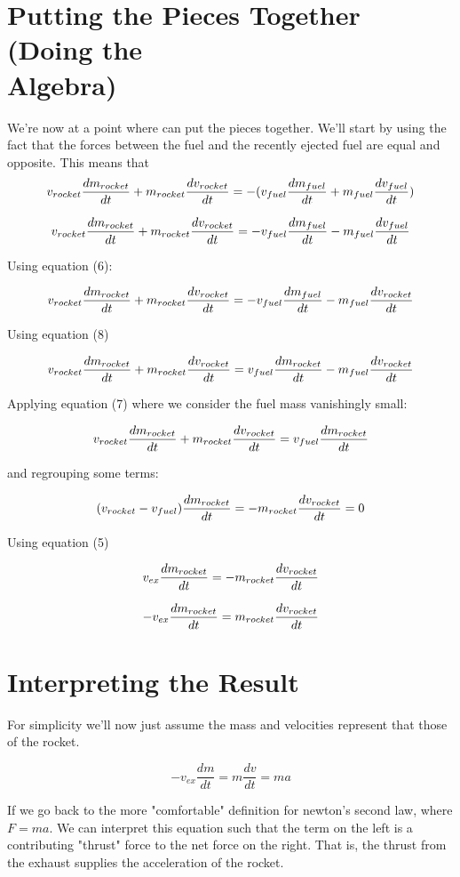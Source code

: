 \documentclass{article}
\begin{document}
\section{Putting the Pieces Together (Doing the \\ Algebra)}
We're now at a point where can put the pieces together. We'll start by using the fact that the forces between the fuel and the recently ejected fuel are equal and opposite. This means that 
$$v_{rocket} \frac{dm_{rocket}}{dt} + m_{rocket}  \frac{dv_{rocket}}{dt} = - ( v_{fuel} \frac{dm_{fuel}}{dt} + m_{fuel}  \frac{dv_{fuel}}{dt})$$

$$v_{rocket} \frac{dm_{rocket}}{dt} + m_{rocket}  \frac{dv_{rocket}}{dt} = - v_{fuel} \frac{dm_{fuel}}{dt} - m_{fuel}  \frac{dv_{fuel}}{dt}$$

Using equation (6):

$$v_{rocket} \frac{dm_{rocket}}{dt} + m_{rocket}  \frac{dv_{rocket}}{dt} = - v_{fuel} \frac{dm_{fuel}}{dt} - m_{fuel}  \frac{dv_{rocket}}{dt}$$

Using equation (8)

$$v_{rocket} \frac{dm_{rocket}}{dt} + m_{rocket}  \frac{dv_{rocket}}{dt} = v_{fuel} \frac{dm_{rocket}}{dt} - m_{fuel}  \frac{dv_{rocket}}{dt}$$

Applying equation (7) where we consider the fuel mass vanishingly small:

$$v_{rocket} \frac{dm_{rocket}}{dt} + m_{rocket}  \frac{dv_{rocket}}{dt} = v_{fuel} \frac{dm_{rocket}}{dt}$$


and regrouping some terms:

$$(v_{rocket} - v_{fuel})\frac{dm_{rocket}}{dt} = - m_{rocket}\frac{dv_{rocket}}{dt} = 0$$

Using equation (5)

$$v_{ex}\frac{dm_{rocket}}{dt} = - m_{rocket}\frac{dv_{rocket}}{dt}$$

\begin{equation}
-v_{ex}\frac{dm_{rocket}}{dt} = m_{rocket}\frac{dv_{rocket}}{dt}
\end{equation}

\section {Interpreting the Result}
For simplicity we'll now just assume the mass and velocities represent that those of the rocket.

\begin{equation}
-v_{ex}\frac{dm}{dt} = m\frac{dv}{dt} = ma
\end{equation}\par
If we go back to the more "comfortable" definition for newton's second law, where $F=ma$.
We can interpret this equation such that the term on the left is a contributing "thrust" force to the net force on the right. That is, the thrust from the exhaust supplies the acceleration of the rocket.
\end{document}
